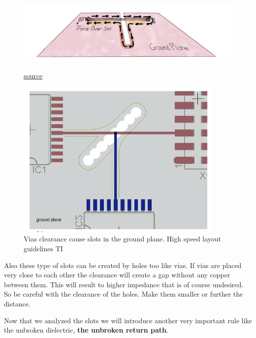 \documentclass[12pt]{article}
\begin{document}
\begin{figure}[h!]
	\centering
	\begin{minipage}[b]{0.3\textwidth}
		\includegraphics[keepaspectratio, width=\textwidth]{assets/slot.png}
		\caption{\href{https://www.tempoautomation.com/blog/design-to-avoid-emi-problems-keep-clocks-away-from-unintended-antennas/}{source}}
	\end{minipage}
	\hfill
	\begin{minipage}[b]{0.3\textwidth}
		\includegraphics[width=\textwidth]{assets/slot_via.png}
		\caption{Vias clearance cause slots in the ground plane. High speed layout guidelines TI}
	\end{minipage}
\end{figure}

Also these type of slots can be created by holes too like vias. If vias are placed very close to each other the clearance will create a gap without any copper between them. This will result to higher impedance that is of course undesired. So be careful with the clearance of the holes. Make them smaller or further the distance.

Now that we analyzed the slots we will introduce another very important rule like the unbroken dielectric, \textbf{the unbroken return path}.
\end{document}
